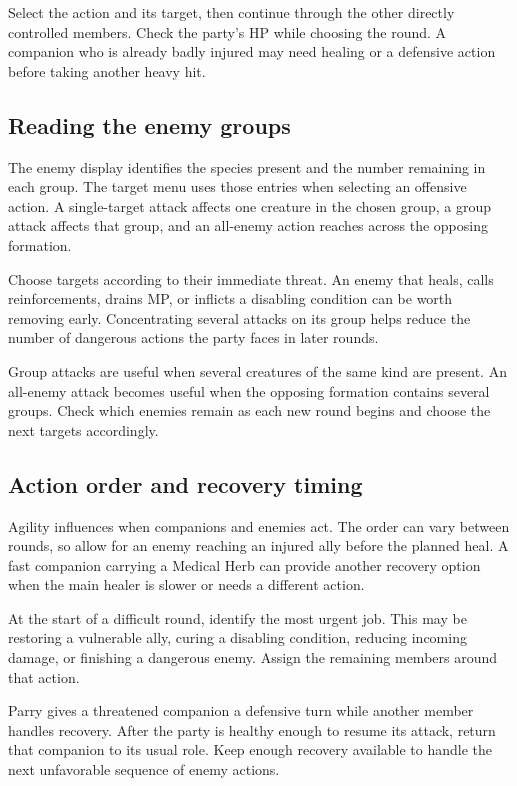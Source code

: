 Select the action and its target, then continue through the other directly
controlled members. Check the party's HP while choosing the round. A
companion who is already badly injured may need healing or a defensive
action before taking another heavy hit.

\subsection*{Reading the enemy groups}

The enemy display identifies the species present and the number remaining
in each group. The target menu uses those entries when selecting an
offensive action. A single-target attack affects one creature in the
chosen group, a group attack affects that group, and an all-enemy action
reaches across the opposing formation.

Choose targets according to their immediate threat. An enemy that heals,
calls reinforcements, drains MP, or inflicts a disabling condition can be
worth removing early. Concentrating several attacks on its group helps
reduce the number of dangerous actions the party faces in later rounds.

Group attacks are useful when several creatures of the same kind are
present. An all-enemy attack becomes useful when the opposing formation
contains several groups. Check which enemies remain as each new round
begins and choose the next targets accordingly.

\subsection*{Action order and recovery timing}

Agility influences when companions and enemies act. The order can vary
between rounds, so allow for an enemy reaching an injured ally before the
planned heal. A fast companion carrying a Medical Herb can provide another
recovery option when the main healer is slower or needs a different action.

At the start of a difficult round, identify the most urgent job. This may
be restoring a vulnerable ally, curing a disabling condition, reducing
incoming damage, or finishing a dangerous enemy. Assign the remaining
members around that action.

Parry gives a threatened companion a defensive turn while another member
handles recovery. After the party is healthy enough to resume its attack,
return that companion to its usual role. Keep enough recovery available
to handle the next unfavorable sequence of enemy actions.


